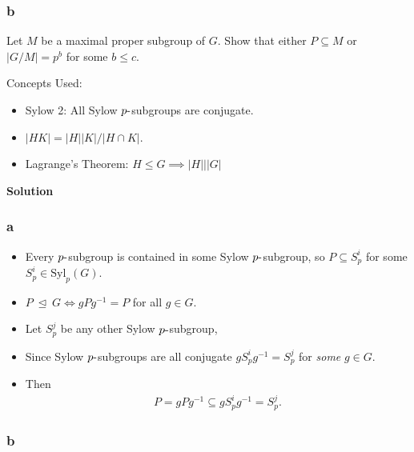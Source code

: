 \hypertarget{b-10}{%
\subsubsection{b}\label{b-10}}

Let \(M\) be a maximal proper subgroup of \(G\). Show that either
\(P \subseteq M\) or \(|G/M | = p^b\) for some \(b \leq c\).

\begin{solution}

Concepts Used:

\begin{itemize}
\tightlist
\item
  Sylow 2: All Sylow \(p{\hbox{-}}\)subgroups are conjugate.
\item
  \({\left\lvert {HK} \right\rvert} = {\left\lvert {H} \right\rvert} {\left\lvert {K} \right\rvert} / {\left\lvert {H\cap K} \right\rvert}\).
\item
  Lagrange's Theorem:
  \(H\leq G \implies {\left\lvert {H} \right\rvert} \mathrel{\Big|}{\left\lvert {G} \right\rvert}\)
\end{itemize}

\textbf{Solution}

\hypertarget{a-11}{%
\subsubsection{a}\label{a-11}}

\begin{itemize}
\item
  Every \(p{\hbox{-}}\)subgroup is contained in some Sylow
  \(p{\hbox{-}}\)subgroup, so \(P \subseteq S_p^i\) for some
  \(S_p^i \in \mathrm{Syl}_p(G)\).
\item
  \(P {~\trianglelefteq~}G \iff gPg^{-1}= P\) for all \(g\in G\).
\item
  Let \(S_p^j\) be any other Sylow \(p{\hbox{-}}\)subgroup,
\item
  Since Sylow \(p{\hbox{-}}\)subgroups are all conjugate
  \(gS_p^i g^{-1}= S_p^j\) for \emph{some} \(g\in G\).
\item
  Then
  \begin{align*}
  P = gPg^{-1}\subseteq gS_p^i g^{-1}= S_p^j
  .\end{align*}
\end{itemize}

\hypertarget{b-11}{%
\subsubsection{b}\label{b-11}}


\end{solution}
